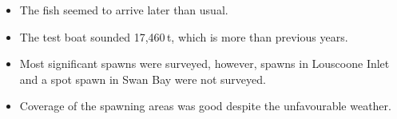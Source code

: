 \begin{itemize}
\item The fish seemed to arrive later than usual.
\item The test boat sounded 17,460\,t, which is more than previous years.
\item Most significant spawns were surveyed, however, spawns in Louscoone Inlet and a spot spawn in Swan Bay were not surveyed.
\item Coverage of the spawning areas was good despite the unfavourable weather.
\end{itemize}